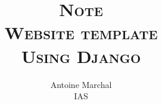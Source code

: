 \documentclass[a4paper,10.5pt]{report}
\title{{\textsc{\Large{Note}\\ [1cm]
      \textbf{\LARGE{
          Website template \\
          Using Django}}}} \\[1cm]}
\author{Antoine Marchal \\ [0.1cm]
   IAS}
\date{}
\begin{document}
\begin{titlingpage}
\maketitle
\end{titlingpage}
\newpage

\newpage




\newpage
\end{document}
